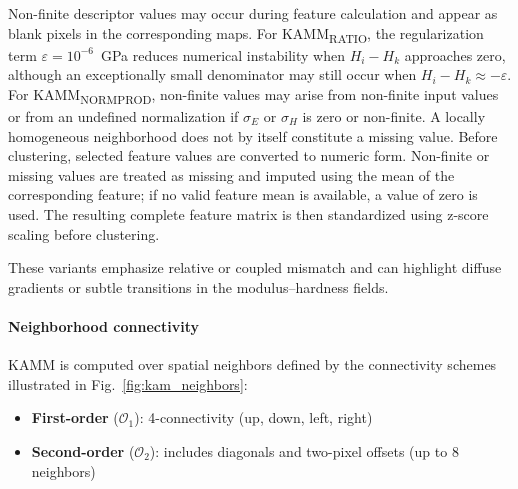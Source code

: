 \documentclass[final,3p,times]{elsarticle}
\begin{document}
Non-finite descriptor values may occur during feature calculation and appear as blank pixels in the corresponding maps. For KAMM\textsubscript{RATIO}, the regularization term $\varepsilon=10^{-6}$~GPa reduces numerical instability when $H_i-H_k$ approaches zero, although an exceptionally small denominator may still occur when $H_i-H_k \approx -\varepsilon$. For KAMM\textsubscript{NORMPROD}, non-finite values may arise from non-finite input values or from an undefined normalization if $\sigma_E$ or $\sigma_H$ is zero or non-finite. A locally homogeneous neighborhood does not by itself constitute a missing value. Before clustering, selected feature values are converted to numeric form. Non-finite or missing values are treated as missing and imputed using the mean of the corresponding feature; if no valid feature mean is available, a value of zero is used. The resulting complete feature matrix is then standardized using z-score scaling before clustering.

These variants emphasize relative or coupled mismatch and can highlight diffuse gradients or subtle transitions in the modulus--hardness fields.

\paragraph{Neighborhood connectivity}
KAMM is computed over spatial neighbors defined by the connectivity schemes illustrated in Fig.~\ref{fig:kam_neighbors}:
\begin{itemize}
    \item \textbf{First-order} ($\mathcal{O}_1$): 4-connectivity (up, down, left, right)
    \item \textbf{Second-order} ($\mathcal{O}_2$): includes diagonals and two-pixel offsets (up to 8 neighbors)
\end{itemize}
\end{document}
